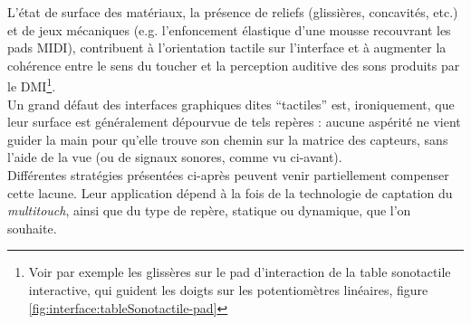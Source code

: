 \noindent L'état de surface des matériaux, la présence de reliefs (glissières, concavités, etc.) et de jeux mécaniques (e.g. l'enfoncement élastique d'une mousse recouvrant les pads \gls{MIDI}), contribuent à l'orientation tactile sur l'interface et à augmenter la cohérence entre le sens du toucher et la perception auditive des sons produits par le \gls{DMI}\footnote{Voir par exemple les glissères sur le pad d'interaction de la table sonotactile interactive, qui guident les doigts sur les potentiomètres linéaires, figure \ref{fig:interface:tableSonotactile-pad}}.\\
\indent Un grand défaut des interfaces graphiques dites ``tactiles'' est, ironiquement, que leur surface est généralement dépourvue de tels repères : aucune aspérité ne vient guider la main pour qu'elle trouve son chemin sur la matrice des capteurs, sans l'aide de la vue (ou de signaux sonores, comme vu ci-avant).\\
\indent Différentes stratégies présentées ci-après peuvent venir partiellement compenser cette lacune. Leur application dépend à la fois de la technologie de captation du \textit{multitouch}, ainsi que du type de repère, statique ou dynamique, que l'on souhaite.

